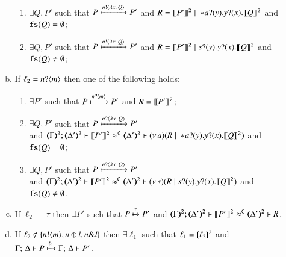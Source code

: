 \begin{enumerate}[1.]
\begin{enumerate}[a)]
\begin{enumerate}[-]
					\item	$\exists Q, P'$ such that $P \xmapsto{n !\langle \lambda x.\,Q \rangle} P'$
						and $R = \llbracket P'\rrbracket^\mathtt{2} \;|\; \ast\! a ? (y) . y ? (x) . \llbracket Q\rrbracket^\mathtt{2}$
						and {$\mathtt{fs}(Q) = \emptyset$};

					\item	$\exists Q, P'$ such that $P \xmapsto{n !\langle \lambda x.\,Q \rangle} P'$
						and $R = \llbracket P'\rrbracket^\mathtt{2} \;|\; s ? (y) . y ? (x) . \llbracket Q\rrbracket^\mathtt{2}$
						and {$\mathtt{fs}(Q) \neq \emptyset$};
					\end{enumerate}

				\item   %
					If  $\ell_2 = n ? \langle m \rangle$ 
					then one of the following holds:
					\begin{enumerate}[-]
					\item	$\exists P'$ such that $P \xmapsto{n ?\langle m \rangle} P'$
						and $R = \llbracket P'\rrbracket^\mathtt{2}$;

					\item	$\exists Q, P'$ such that
						$P \xmapsto{n ?\langle \lambda x.\,Q \rangle} P'$\\
						and $\horel{\tmap{\Gamma}{2}}{\tmap{\Delta'}{2}}{\pmap{P'}{2}}{\fwb}{\tmap{\Delta'}{2}}{\news{a}(R \Par \repl{} \binp{a}{y} \binp{y}{x} \pmap{Q}{2})}$ and {$\mathtt{fs}(Q) = \emptyset$}; 
					\item	$\exists Q, P'$ such that
						$P \xmapsto{n ?\langle \lambda x.\,Q \rangle} P'$\\
						and $\horel{\tmap{\Gamma}{2}}{\tmap{\Delta'}{2}}{\pmap{P'}{2}}{\fwb}{\tmap{\Delta'}{2}}{\news{s}(R \Par \binp{s}{y} \binp{y}{x} \pmap{Q}{2})}$  and {$\mathtt{fs}(Q) \neq \emptyset$}.
					\end{enumerate}
		
				\item   
					If  %
					$\ell_2 = \tau$ 
					then $\exists P'$ such that
					$P \xmapsto{\tau} P'$
					and $\horel{\tmap{\Gamma}{2}}{\tmap{\Delta'}{2}}{\pmap{P'}{2}}{\fwb}{\tmap{\Delta'}{2}}{R}$.
				\item	 
					If  
					$\ell_2 \not\in \{n ! \langle m \rangle, n \oplus l, n \& l\}$ 
					 then 
					$\exists \ell_1$ such that 
					$\ell_1 = \{\!\!\{\ell_2\}\!\!\}^{\mathtt{2}}$ and \\
					$ \Gamma ;\, \Delta  \vdash   P
					\xmapsto{\ell_1}
					\Gamma ;\, \Delta  \vdash   P'$.
		\end{enumerate}
	\end{enumerate}
